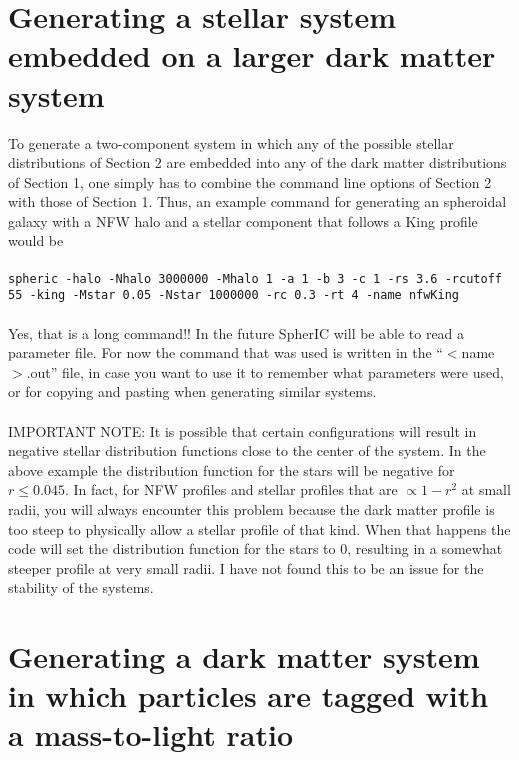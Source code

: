 \documentclass[letterpaper,10pt]{article}
\begin{document}
\section{Generating a stellar system embedded on a larger dark matter system}

To generate a two-component system in which any of the possible stellar distributions of Section 2 are embedded into any of the dark matter distributions of Section 1, one simply has to combine the command line options of Section 2 with those of Section 1. Thus, an example command for generating an spheroidal galaxy with a NFW halo and a stellar component that follows a King profile would be\\
\\
\texttt{spheric -halo -Nhalo 3000000 -Mhalo 1 -a 1 -b 3 -c 1 -rs 3.6 -rcutoff 55 -king -Mstar 0.05 -Nstar 1000000 -rc 0.3 -rt 4 -name nfwKing}\\
\\
Yes, that is a long command!! In the future SpherIC will be able to read a parameter file. For now the command that was used is written in the ``$<$name$>$.out'' file, in case you want to use it to remember what parameters were used, or for copying and pasting when generating similar systems.\\
\\
IMPORTANT NOTE: It is possible that certain configurations will result in negative stellar distribution functions close to the center of the system. In the above example the distribution function for the stars will be negative for $r \leq 0.045$. In fact, for NFW profiles and stellar profiles that are $\propto 1-r^2$ at small radii, you will always encounter this problem because the dark matter profile is too steep to physically allow a stellar profile of that kind. When that happens the code will set the distribution function for the stars to $0$, resulting in a somewhat steeper profile at very small radii. I have not found this to be an issue for the stability of the systems. 


\section{Generating a dark matter system in which particles are tagged with a mass-to-light ratio}
\end{document}
